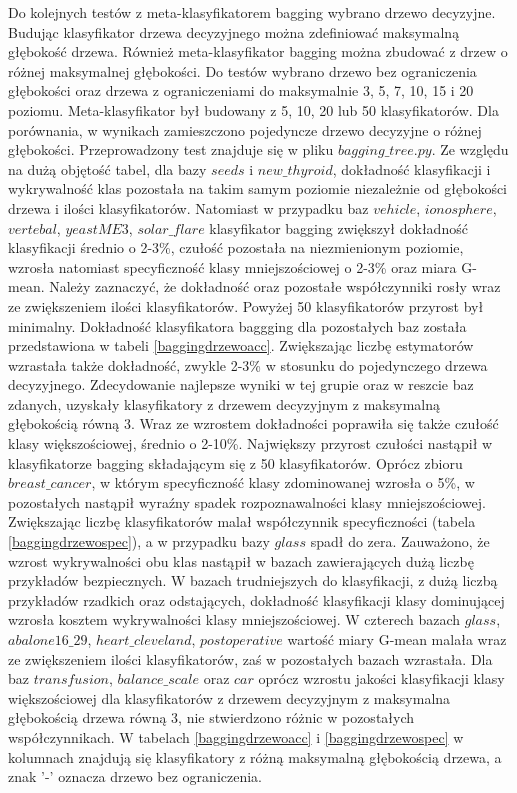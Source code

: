 Do kolejnych testów z meta-klasyfikatorem bagging wybrano drzewo decyzyjne. Budując klasyfikator drzewa decyzyjnego można zdefiniować maksymalną głębokość drzewa. Również meta-klasyfikator bagging można zbudować z drzew o różnej maksymalnej głębokości. Do testów wybrano drzewo bez ograniczenia głębokości oraz drzewa z ograniczeniami do maksymalnie 3, 5, 7, 10, 15 i 20 poziomu. Meta-klasyfikator był budowany z 5, 10, 20 lub 50 klasyfikatorów. Dla porównania, w wynikach zamieszczono pojedyncze drzewo decyzyjne o różnej głębokości. Przeprowadzony test znajduje się w pliku $bagging\_tree.py$. Ze względu na dużą objętość tabel, dla bazy $seeds$ i $new\_thyroid$, dokładność klasyfikacji i wykrywalność klas pozostała na takim samym poziomie niezależnie od głębokości drzewa i ilości klasyfikatorów. Natomiast w przypadku baz $vehicle$, $ionosphere$, $vertebal$, $yeastME3$, $solar\_flare$ klasyfikator bagging zwiększył dokładność klasyfikacji średnio o 2-3\%, czułość pozostała na niezmienionym poziomie, wzrosła natomiast specyficzność klasy mniejszościowej o 2-3\% oraz miara G-mean. Należy zaznaczyć, że dokładność oraz pozostałe współczynniki rosły wraz ze zwiększeniem ilości klasyfikatorów. Powyżej 50 klasyfikatorów przyrost był minimalny. Dokładność klasyfikatora baggging dla pozostałych baz została przedstawiona w tabeli \ref{baggingdrzewoacc}. Zwiększając liczbę estymatorów wzrastała także dokładność, zwykle 2-3\% w stosunku do pojedynczego drzewa decyzyjnego. Zdecydowanie najlepsze wyniki w tej grupie oraz w reszcie baz zdanych, uzyskały klasyfikatory z drzewem decyzyjnym z maksymalną głębokością równą 3. Wraz ze wzrostem dokładności poprawiła się także czułość klasy większościowej, średnio o 2-10\%. Największy przyrost czułości nastąpił w klasyfikatorze bagging składającym się z 50 klasyfikatorów. Oprócz zbioru $breast\_cancer$, w którym specyficzność klasy zdominowanej wzrosła o 5\%, w pozostałych nastąpił wyraźny spadek rozpoznawalności klasy mniejszościowej. Zwiększając liczbę klasyfikatorów malał współczynnik specyficzności (tabela \ref{baggingdrzewospec}), a w przypadku bazy $glass$ spadł do zera. Zauważono, że wzrost wykrywalności obu klas nastąpił w bazach zawierających dużą liczbę przykładów bezpiecznych. W bazach trudniejszych do klasyfikacji, z dużą liczbą przykładów rzadkich oraz odstających, dokładność klasyfikacji klasy dominującej wzrosła kosztem wykrywalności klasy mniejszościowej. W czterech bazach $glass$, $abalone16\_29$, $heart\_cleveland$, $postoperative$ wartość miary G-mean malała wraz ze zwiększeniem ilości klasyfikatorów, zaś w pozostałych bazach wzrastała. Dla baz $transfusion$, $balance\_scale$ oraz $car$ oprócz wzrostu jakości klasyfikacji klasy większościowej dla klasyfikatorów z drzewem decyzyjnym z maksymalna głębokością drzewa równą 3, nie stwierdzono różnic w pozostałych współczynnikach. W tabelach \ref{baggingdrzewoacc} i \ref{baggingdrzewospec} w kolumnach znajdują się klasyfikatory z różną maksymalną głębokością drzewa, a znak '-' oznacza drzewo bez ograniczenia.
